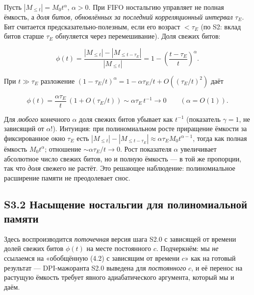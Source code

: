 \documentclass[12pt]{iopart}
\begin{document}
Пусть \(|M_{\le t}| = M_0 t^\alpha\), \(\alpha > 0\). При FIFO ностальгию управляет не полная ёмкость, а \emph{доля битов, обновлённых за последний корреляционный интервал} \(\tau_E\). Бит считается предсказательно-полезным, если его возраст \(< \tau_E\) (по S2: вклад битов старше \(\tau_E\) обнуляется через перемешивание). Доля свежих битов:



\begin{equation}\phi(t) = \frac{|M_{\le t}| - |M_{\le t-\tau_E}|}{|M_{\le t}|} = 1 - \left(\frac{t-\tau_E}{t}\right)^\alpha. \tag{S3.1}\end{equation}



При \(t \gg \tau_E\) разложение \((1-\tau_E/t)^\alpha = 1 - \alpha\tau_E/t + O((\tau_E/t)^2)\) даёт



\begin{equation}\phi(t) = \frac{\alpha\tau_E}{t}\,(1 + O(\tau_E/t)) \sim \alpha\tau_E\,t^{-1} \to 0 \qquad (\alpha = O(1)). \tag{S3.2}\end{equation}



Для \emph{любого} конечного \(\alpha\) доля свежих битов убывает как \(t^{-1}\) (показатель \(\gamma = 1\), не зависящий от \(\alpha\)!). Интуиция: при полиномиальном росте приращение ёмкости за фиксированное окно \(\tau_E\) есть \(|M_{\le t}| - |M_{\le t-\tau_E}| \approx \alpha\tau_E M_0 t^{\alpha-1}\), тогда как полная ёмкость \(M_0 t^\alpha\); отношение \(\sim \alpha\tau_E/t \to 0\). Рост показателя \(\alpha\) увеличивает абсолютное число свежих битов, но и полную ёмкость --- в той же пропорции, так что \emph{доля} свежего не растёт. Это решающее наблюдение: полиномиальное расширение памяти не преодолевает снос.



\subsection{S3.2 Насыщение ностальгии для полиномиальной памяти}\label{s3.2-ux43dux430ux441ux44bux449ux435ux43dux438ux435-ux43dux43eux441ux442ux430ux43bux44cux433ux438ux438-ux434ux43bux44f-ux43fux43eux43bux438ux43dux43eux43cux438ux430ux43bux44cux43dux43eux439-ux43fux430ux43cux44fux442ux438}



Здесь воспроизводится \emph{поточечная} версия шага S2.0 с зависящей от времени долей свежих битов \(\phi(t)\) на месте постоянного \(c\). Подчеркнём: мы \emph{не} ссылаемся на «обобщённую (4.2) с зависящим от времени \(c\)» как на готовый результат --- DPI-мажоранта S2.0 выведена для \emph{постоянного} \(c\), и её перенос на растущую ёмкость требует явного адиабатического аргумента, который мы и даём.
\end{document}
